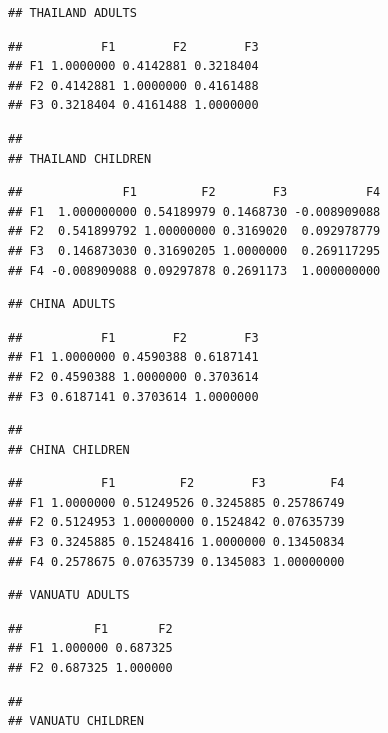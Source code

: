 \documentclass[
  man]{apa6}
\begin{document}
\begin{verbatim}
## THAILAND ADULTS
\end{verbatim}

\begin{verbatim}
##           F1        F2        F3
## F1 1.0000000 0.4142881 0.3218404
## F2 0.4142881 1.0000000 0.4161488
## F3 0.3218404 0.4161488 1.0000000
\end{verbatim}

\begin{verbatim}
## 
## THAILAND CHILDREN
\end{verbatim}

\begin{verbatim}
##              F1         F2        F3           F4
## F1  1.000000000 0.54189979 0.1468730 -0.008909088
## F2  0.541899792 1.00000000 0.3169020  0.092978779
## F3  0.146873030 0.31690205 1.0000000  0.269117295
## F4 -0.008909088 0.09297878 0.2691173  1.000000000
\end{verbatim}

\begin{verbatim}
## CHINA ADULTS
\end{verbatim}

\begin{verbatim}
##           F1        F2        F3
## F1 1.0000000 0.4590388 0.6187141
## F2 0.4590388 1.0000000 0.3703614
## F3 0.6187141 0.3703614 1.0000000
\end{verbatim}

\begin{verbatim}
## 
## CHINA CHILDREN
\end{verbatim}

\begin{verbatim}
##           F1         F2        F3         F4
## F1 1.0000000 0.51249526 0.3245885 0.25786749
## F2 0.5124953 1.00000000 0.1524842 0.07635739
## F3 0.3245885 0.15248416 1.0000000 0.13450834
## F4 0.2578675 0.07635739 0.1345083 1.00000000
\end{verbatim}

\begin{verbatim}
## VANUATU ADULTS
\end{verbatim}

\begin{verbatim}
##          F1       F2
## F1 1.000000 0.687325
## F2 0.687325 1.000000
\end{verbatim}

\begin{verbatim}
## 
## VANUATU CHILDREN
\end{verbatim}
\end{document}
